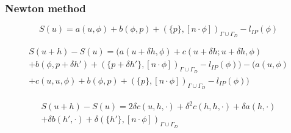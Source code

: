 \documentclass{beamer}
\begin{document}
\begin{frame}
\frametitle{Newton method}

\begin{flushleft}
\begin{equation}
S(u) = a(u,\phi) + b(\phi,p) + (\{p\},[n\cdot \phi])_{\Gamma \cup \Gamma_D} - l_{IP}(\phi)
\end{equation}
\end{flushleft}

\begin{flushleft}
\begin{equation}
\begin{split}
S(u+h) - S(u) = (a(u+\delta h,\phi) + c(u + \delta h;u + \delta h,\phi)\\ + b(\phi,p+\delta h') + (\{p+\delta h'\},[n\cdot \phi])_{\Gamma \cup \Gamma_D} - l_{IP}(\phi)) - (a(u,\phi)\\ + c(u,u,\phi) + b(\phi,p) + (\{p\},[n\cdot \phi])_{\Gamma \cup \Gamma_D} - l_{IP}(\phi))
\end{split}
\end{equation}
\end{flushleft}

\begin{flushleft}
\begin{equation}
\begin{split}
S(u+h) - S(u) = 2\delta c(u,h,\cdot) + \delta^2 c(h,h,\cdot) + \delta a(h,\cdot)\\ + \delta b(h',\cdot) + \delta (\{h'\},[n\cdot \phi])_{\Gamma \cup \Gamma_D}
\end{split}
\end{equation}
\end{flushleft}

\end{frame}

\end{document}
